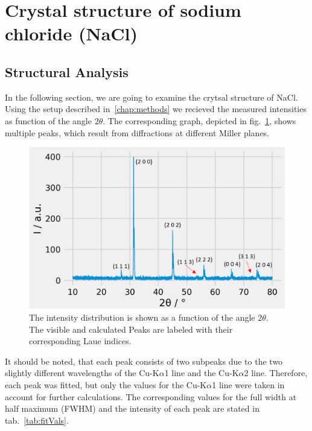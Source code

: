 \section{Crystal structure of sodium chloride (NaCl)}
\label{sec:NaCl}

\subsection*{Structural Analysis}


In the following section, we are going to examine the crytsal structure of NaCl. Using the setup described in~\ref{chap:methods} we recieved the measured intensities as function of the angle $2\theta$. The corresponding graph, depicted in fig.~\ref{fig:PeaksNaCl}, shows multiple peaks, which result from diffractions at different Miller planes.  

\begin{figure}[ht]
    \centering
    \includegraphics[angle = 90, width = 0.8\linewidth]{Bilder/Auswertung/NaCl/Ivs2thwIndices.png}
    \caption{The intensity distribution is shown as a function of the angle $2\theta$. The visible and calculated Peaks are labeled with their corresponding Laue indices.}
    \label{fig:PeaksNaCl}
\end{figure}

It should be noted, that each peak consists of two subpeaks due to the two slightly different wavelengths of the Cu-K$\alpha$1 line and the Cu-K$\alpha$2 line. Therefore, each peak was fitted, but only the values for the Cu-K$\alpha$1 line were taken in account for further calculations. The corresponding values for the full width at half maximum (FWHM) and the intensity of each peak are stated in tab.~\ref{tab:fitVals}.

